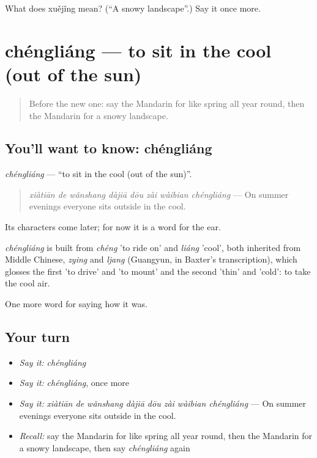 \begin{tcolorbox}[breakable,colback=teal!4,colframe=teal!35!black,title={Before you move on}]
What does xuějǐng mean? (\textquotedblleft{}A snowy landscape\textquotedblright{}.) Say it once more.
\end{tcolorbox}
\section[chéngliáng]{chéngliáng — to sit in the cool (out of the sun)}

\label{lesson:ZH-C519-chengliang}



\begin{quote}
Before the new one: say the Mandarin for like spring all year round, then the Mandarin for a snowy landscape.
\end{quote}

\subsection*{You'll want to know: chéngliáng}
\emph{chéngliáng} — \textquotedblleft{}to sit in the cool (out of the sun)\textquotedblright{}.

\begin{quote}
\emph{xiàtiān de wǎnshang dàjiā dōu zài wàibian chéngliáng} — On summer evenings everyone sits outside in the cool.
\end{quote}

Its characters come later; for now it is a word for the ear.

\begin{cousinweb}
\emph{chéngliáng} is built from \emph{chéng} 'to ride on' and \emph{liáng} 'cool', both inherited from Middle Chinese, \emph{zying} and \emph{ljang} (Guangyun, in Baxter's transcription), which glosses the first 'to drive' and 'to mount' and the second 'thin' and 'cold': to take the cool air.
\end{cousinweb}

\begin{grammarlens}[title={What you've built}]
One more word for saying how it was.
\end{grammarlens}

\subsection*{Your turn}
\begin{itemize}
\raggedright
  \item \emph{Say it:} \emph{chéngliáng}
  \item \emph{Say it:} \emph{chéngliáng}, once more
  \item \emph{Say it:} \emph{xiàtiān de wǎnshang dàjiā dōu zài wàibian chéngliáng} — On summer evenings everyone sits outside in the cool.
  \item \emph{Recall:} say the Mandarin for like spring all year round, then the Mandarin for a snowy landscape, then say \emph{chéngliáng} again
\end{itemize}

